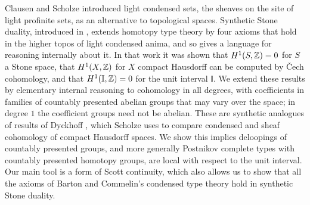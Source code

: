 Clausen and Scholze \cite{Scholze} introduced light condensed sets, the sheaves on the site of light profinite sets, as an alternative to topological spaces.
Synthetic Stone duality, introduced in \cite{synthetic-stone-duality}, extends homotopy type theory by four axioms that hold in the higher topos of light condensed anima, and so gives a language for reasoning internally about it. In that work it was shown that $H^1(S,\mathbb{Z}) = 0$ for $S$ a Stone space, that $H^1(X,\mathbb{Z})$ for $X$ compact Hausdorff can be computed by \v{C}ech cohomology, and that $H^1(\mathbb{I},\mathbb{Z}) = 0$ for the unit interval $\mathbb{I}$.
We extend these results by elementary internal reasoning to cohomology in all degrees, with coefficients in families of countably presented abelian groups that may vary over the space; in degree $1$ the coefficient groups need not be abelian. These are synthetic analogues of results of Dyckhoff \cite{dyckhoff76,dyckhoff76-1}, which Scholze uses to compare condensed and sheaf cohomology of compact Hausdorff spaces. We show this implies deloopings of countably presented groups, and more generally Postnikov complete types with countably presented homotopy groups, are local with respect to the unit interval.
Our main tool is a form of Scott continuity, which also allows us to show that all the axioms of Barton and Commelin's condensed type theory \cite{bc24} hold in synthetic Stone duality.
